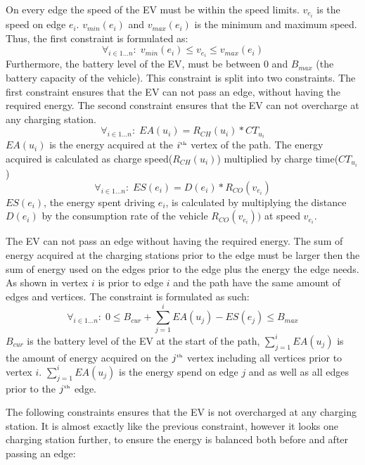 On every edge the speed of the EV must be within the speed limits. $v_{e_i}$ is the speed on edge $e_i$. $v_{min}(e_i)$ and $v_{max}(e_i)$ is the minimum and maximum speed. Thus, the first constraint is formulated as:
\begin{equation*}
\forall_{i\in1 \dots n }:\;v_{min}(e_i) \leq v_{e_i} \leq v_{max}(e_i)
\end{equation*}
Furthermore, the battery level of the EV, must be between $0$ and $B_{max}$ (the battery capacity of the vehicle).
This constraint is split into two constraints. The first constraint ensures that the EV can not pass an edge, without having the required energy. The second constraint ensures that the EV can not overcharge at any charging station.
\begin{equation*}
\forall_{i\in1 \dots n }:\; EA(u_i) = R_{CH}(u_i) * CT_{u_i}
\end{equation*}
$EA(u_i)$ is the energy acquired at the $i^{\text{\tiny th}}$ vertex of the path. The energy acquired is calculated as charge speed($R_{CH}(u_i)$) multiplied by charge time($CT_{u_i}$)
\begin{equation*}
\forall_{i\in1 \dots n }:\; ES(e_i) = D(e_i)*R_{CO}(v_{e_i})
\end{equation*}
$ES(e_i)$, the energy spent driving $e_i$, is calculated by multiplying the distance $D(e_i)$ by the consumption rate of the vehicle $R_{CO}(v_{e_i}))$ at speed $v_{e_i}$.

The EV can not pass an edge without having the required energy. The sum of energy acquired at the charging stations prior to the edge must be larger then the sum of energy used on the edges prior to the edge plus the energy the edge needs. As shown in  vertex $i$ is prior to edge $i$ and the path have the same amount of edges and vertices.
The constraint is formulated as such:
\begin{equation*}
\forall_{i\in1 \dots n }:\;0 \leq B_{cur} + \sum_{j=1}^{i} EA(u_j) - ES(e_j) \leq B_{max}
\end{equation*}\label{eq:energyreq}
$B_{cur}$ is the battery level of the EV at the start of the path, $ \sum_{j=1}^{i} EA(u_j)$ is the amount of energy acquired on the $j^{\text{\tiny th}}$ vertex including all vertices prior to vertex $i$. $\sum_{j=1}^{i} EA(u_j)$ is the energy spend on edge $j$ and as well as all edges prior to the $j^{\text{\tiny th}}$ edge.

The following constraints ensures that the EV is not overcharged at any charging station. It is almost exactly like the previous constraint, however it looks one charging station further, to ensure the energy is balanced both before and after passing an edge:

